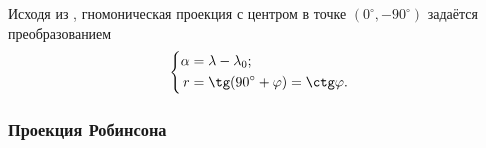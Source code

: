 Исходя из , гномоническая проекция с центром в точке $(0^\circ, -90^\circ)$ задаётся преобразованием
\begin{equation}
    \left\{\begin{aligned}
        \alpha &= \lambda - \lambda_0;\\
        r &= \tg (90^\circ + \varphi) = \ctg \varphi.
    \end{aligned}\right.
\end{equation}

\subsubsection{Проекция Робинсона}

